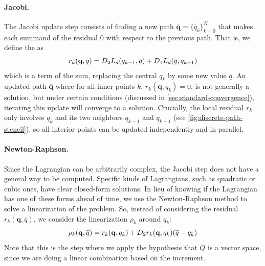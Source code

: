 \paragraph{Jacobi.}
The Jacobi update step consists of finding a new path $\overline{\mathbf{q}} = \{ \overline{q}_k \}_{k=0}^N$ that makes each summand of the residual $0$ with respect to the previous path. That is, we define the  as
\begin{equation}
	r_k(\mathbf{q}, \overline{q}) =
	D_{2} L_d (q_{k-1}, \overline{q}) + D_{1} L_d (\overline{q}, q_{k+1})
	\label{eq:residual-local}
\end{equation}
which is a term of the sum, replacing the central $q_k$ by some new value $\overline{q}$. An updated path $\overline{\mathbf{q}}$ where for all inner points $k$, $r_k(\mathbf{q}, \overline{q}_k) = 0$, is not generally a solution, but under certain conditions (discussed in \cref{sec:standard-convergence}), iterating this update will converge to a solution. Crucially, the local residual $r_k$ only involves $q_k$ and its two neighbors $q_{k-1}$ and $q_{k+1}$ (see \cref{fig:discrete-path-stencil}), so all interior points can be updated independently and in parallel.

\paragraph{Newton-Raphson.}
Since the Lagrangian can be arbitrarily complex, the Jacobi step does not have a general way to be computed. Specific kinds of Lagrangians, such as quadratic or cubic ones, have clear closed-form solutions. In lieu of knowing if the Lagrangian has one of these forms ahead of time, we use the Newton-Raphson method to solve a linearization of the problem. So, instead of considering the residual $r_k(\mathbf{q}, \overline{q})$, we consider the linearization $\rho_k$ around $q_k$:
\[
	\rho_k (\mathbf{q}, \overline{q}) = r_k(\mathbf{q}, q_k) + D_{2} r_k(\mathbf{q}, q_k) (\overline{q} - q_k)
\]
Note that this is the step where we apply the hypothesis that $Q$ is a vector space, since we are doing a linear combination based on the increment.

